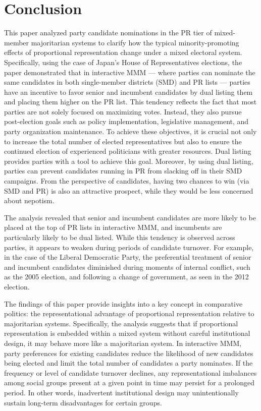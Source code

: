 \documentclass[a4paper, 11pt]{article}
\begin{document}
\section{Conclusion}

This paper analyzed party candidate nominations in the PR tier of mixed-member majoritarian systems to clarify how the typical minority-promoting effects of proportional representation change under a mixed electoral system. Specifically, using the case of Japan’s House of Representatives elections, the paper demonstrated that in interactive MMM — where parties can nominate the same candidates in both single-member districts (SMD) and PR lists — parties have an incentive to favor senior and incumbent candidates by dual listing them and placing them higher on the PR list. This tendency reflects the fact that most parties are not solely focused on maximizing votes. Instead, they also pursue post-election goals such as policy implementation, legislative management, and party organization maintenance. To achieve these objectives, it is crucial not only to increase the total number of elected representatives but also to ensure the continued election of experienced politicians with greater resources. Dual listing provides parties with a tool to achieve this goal. Moreover, by using dual listing, parties can prevent candidates running in PR from slacking off in their SMD campaigns. From the perspective of candidates, having two chances to win (via SMD and PR) is also an attractive prospect, while they would be less concerned about nepotism.

The analysis revealed that senior and incumbent candidates are more likely to be placed at the top of PR lists in interactive MMM, and incumbents are particularly likely to be dual listed. While this tendency is observed across parties, it appears to weaken during periods of candidate turnover. For example, in the case of the Liberal Democratic Party, the preferential treatment of senior and incumbent candidates diminished during moments of internal conflict, such as the 2005 election, and following a change of government, as seen in the 2012 election.

The findings of this paper provide insights into a key concept in comparative politics: the representational advantage of proportional representation relative to majoritarian systems. Specifically, the analysis suggests that if proportional representation is embedded within a mixed system without careful institutional design, it may behave more like a majoritarian system. In interactive MMM, party preferences for existing candidates reduce the likelihood of new candidates being elected and limit the total number of candidates a party nominates. If the frequency or level of candidate turnover declines, any representational imbalances among social groups present at a given point in time may persist for a prolonged period. In other words, inadvertent institutional design may unintentionally sustain long-term disadvantages for certain groups.
\end{document}
